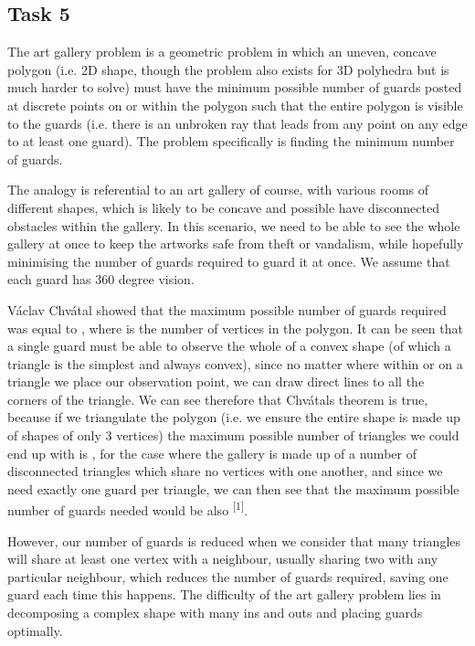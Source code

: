 \documentclass[
]{article}
\begin{document}
\subsection{Task 5}\label{task-5}

The art gallery problem is a geometric problem in which an uneven,
concave polygon (i.e. 2D shape, though the problem also exists for 3D
polyhedra but is much harder to solve) must have the minimum possible
number of \textquotesingle guards\textquotesingle{} posted at discrete
points on or within the polygon such that the entire polygon is
\textquotesingle visible\textquotesingle{} to the guards (i.e. there is
an unbroken ray that leads from any point on any edge to at least one
guard). The problem specifically is finding the minimum number of
guards.

The analogy is referential to an art gallery of course, with various
rooms of different shapes, which is likely to be concave and possible
have disconnected obstacles within the gallery. In this scenario, we
need to be able to see the whole gallery at once to keep the artworks
safe from theft or vandalism, while hopefully minimising the number of
guards required to guard it at once. We assume that each guard has 360
degree vision.

Václav Chvátal showed that the maximum possible number of guards
required was equal to {} , where {} is the number of vertices in the
polygon. It can be seen that a single guard must be able to observe the
whole of a convex shape (of which a triangle is the simplest and always
convex), since no matter where within or on a triangle we place our
observation point, we can draw direct lines to all the corners of the
triangle. We can see therefore that Chvátal\textquotesingle s theorem is
true, because if we triangulate the polygon (i.e. we ensure the entire
shape is made up of shapes of only 3 vertices) the maximum possible
number of triangles we could end up with is {} , for the case where the
gallery is made up of a number of disconnected triangles which share no
vertices with one another, and since we need exactly one guard per
triangle, we can then see that the maximum possible number of guards
needed would be also {} \textsuperscript{{[}1{]}}.

However, our number of guards is reduced when we consider that many
triangles will share at least one vertex with a neighbour, usually
sharing two with any particular neighbour, which reduces the number of
guards required, saving one guard each time this happens. The difficulty
of the art gallery problem lies in decomposing a complex shape with many
\textquotesingle ins and outs\textquotesingle{} and placing guards
optimally.
\end{document}
